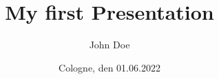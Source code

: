 \usepackage{blindtext}
\usepackage{varsfromjobname}
\usepackage{amsmath}
\usepackage{array}

\usetheme{\gettwofromjobname}

\title{My first Presentation}
\author{John Doe}
\date{Cologne, den 01.06.2022}


